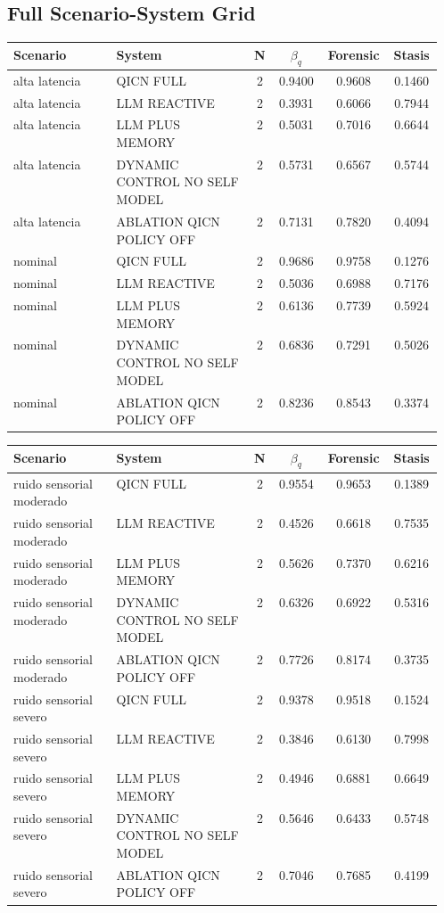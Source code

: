\documentclass[11pt,a4paper]{article}
\theoremstyle{definition}
\begin{document}
\subsection{Full Scenario-System Grid}
\begingroup
\small
\setlength{\tabcolsep}{3pt}
\begin{tabular}{>{\raggedright\arraybackslash}p{0.24\linewidth}>{\raggedright\arraybackslash}p{0.32\linewidth}cccc}
\toprule
Scenario & System & N & $\beta_q$ & Forensic & Stasis \\
\midrule
alta latencia & QICN FULL & 2 & 0.9400 & 0.9608 & 0.1460 \\
alta latencia & LLM REACTIVE & 2 & 0.3931 & 0.6066 & 0.7944 \\
alta latencia & LLM PLUS MEMORY & 2 & 0.5031 & 0.7016 & 0.6644 \\
alta latencia & DYNAMIC CONTROL NO SELF MODEL & 2 & 0.5731 & 0.6567 & 0.5744 \\
alta latencia & ABLATION QICN POLICY OFF & 2 & 0.7131 & 0.7820 & 0.4094 \\
nominal & QICN FULL & 2 & 0.9686 & 0.9758 & 0.1276 \\
nominal & LLM REACTIVE & 2 & 0.5036 & 0.6988 & 0.7176 \\
nominal & LLM PLUS MEMORY & 2 & 0.6136 & 0.7739 & 0.5924 \\
nominal & DYNAMIC CONTROL NO SELF MODEL & 2 & 0.6836 & 0.7291 & 0.5026 \\
nominal & ABLATION QICN POLICY OFF & 2 & 0.8236 & 0.8543 & 0.3374 \\
\bottomrule
\end{tabular}
\par\medskip\noindent
\begin{tabular}{>{\raggedright\arraybackslash}p{0.24\linewidth}>{\raggedright\arraybackslash}p{0.32\linewidth}cccc}
\toprule
Scenario & System & N & $\beta_q$ & Forensic & Stasis \\
\midrule
ruido sensorial moderado & QICN FULL & 2 & 0.9554 & 0.9653 & 0.1389 \\
ruido sensorial moderado & LLM REACTIVE & 2 & 0.4526 & 0.6618 & 0.7535 \\
ruido sensorial moderado & LLM PLUS MEMORY & 2 & 0.5626 & 0.7370 & 0.6216 \\
ruido sensorial moderado & DYNAMIC CONTROL NO SELF MODEL & 2 & 0.6326 & 0.6922 & 0.5316 \\
ruido sensorial moderado & ABLATION QICN POLICY OFF & 2 & 0.7726 & 0.8174 & 0.3735 \\
ruido sensorial severo & QICN FULL & 2 & 0.9378 & 0.9518 & 0.1524 \\
ruido sensorial severo & LLM REACTIVE & 2 & 0.3846 & 0.6130 & 0.7998 \\
ruido sensorial severo & LLM PLUS MEMORY & 2 & 0.4946 & 0.6881 & 0.6649 \\
ruido sensorial severo & DYNAMIC CONTROL NO SELF MODEL & 2 & 0.5646 & 0.6433 & 0.5748 \\
ruido sensorial severo & ABLATION QICN POLICY OFF & 2 & 0.7046 & 0.7685 & 0.4199 \\
\bottomrule
\end{tabular}
\end{document}

